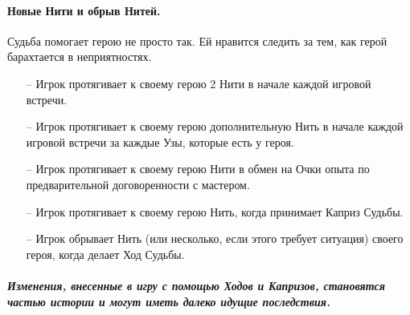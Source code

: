 \paragraph{Новые Нити и обрыв Нитей.} Судьба помогает герою не просто так. Ей нравится следить за тем, как герой барахтается в неприятностях.
\begin{itemize}
\item[--]Игрок протягивает к своему герою 2 Нити в начале каждой игровой встречи.
\item[--]Игрок протягивает к своему герою дополнительную Нить в начале каждой игровой встречи за каждые Узы, которые есть у героя.
\item[--]Игрок протягивает к своему герою Нити в обмен на Очки опыта по предварительной договоренности с мастером.
\item[--]Игрок протягивает к своему герою Нить, когда принимает Каприз Судьбы.
\item[--]Игрок обрывает Нить (или несколько, если этого требует ситуация) своего героя, когда делает Ход Судьбы.
\end{itemize}

\paragraph{\textit{Изменения, внесенные в игру с помощью Ходов и Капризов, становятся частью истории и могут иметь далеко идущие последствия.}}

